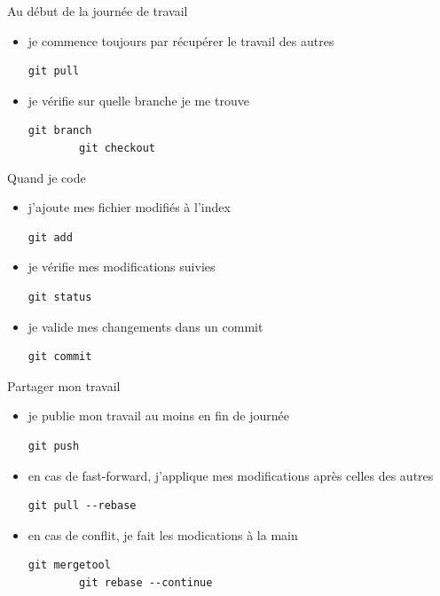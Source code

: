 \documentclass{beamer}
\begin{document}
\begin{frame}[fragile]{Au début de la journée de travail}

	\begin{itemize}
		\item je commence toujours par récupérer le travail des autres
		\begin{lstlisting}[frame=single]
		git pull
		\end{lstlisting}
	
		\item je vérifie sur quelle branche je me trouve
		\begin{lstlisting}[frame=single]
		git branch
		git checkout
		\end{lstlisting}
	\end{itemize}

\end{frame}

\begin{frame}[fragile]{Quand je code}
	\begin{itemize}
		\item j'ajoute mes fichier modifiés à l'index
		\begin{lstlisting}[frame=single]
		git add
		\end{lstlisting}
		\item je vérifie mes modifications suivies
		\begin{lstlisting}[frame=single]
		git status
		\end{lstlisting}
		\item je valide mes changements dans un commit
		\begin{lstlisting}[frame=single]
		git commit
		\end{lstlisting}
	\end{itemize}	
\end{frame}

\begin{frame}[fragile]{Partager mon travail}
	\begin{itemize}
	\item je publie mon travail au moins en fin de journée
	\begin{lstlisting}[frame=single]
		git push
	\end{lstlisting}
	\item en cas de fast-forward, j'applique mes modifications après celles des autres
	\begin{lstlisting}[frame=single]
		git pull --rebase
	\end{lstlisting}
	\item en cas de conflit, je fait les modications à la main
	\begin{lstlisting}[frame=single]
		git mergetool
		git rebase --continue
	\end{lstlisting}
	\end{itemize}
\end{frame}
\end{document}

